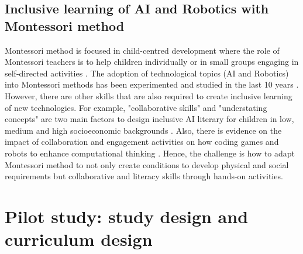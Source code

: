 \documentclass[sigconf,anonymous,review]{acmart}
\begin{document}




\subsection{Inclusive learning of AI and Robotics with Montessori method}
Montessori method is focused in child-centred development where the role of Montessori teachers is to help children individually or in small groups engaging in self-directed activities \cite{Aljabreen2020}.
The adoption of technological topics (AI and Robotics) into Montessori methods has been experimented and studied in the last 10 years \cite{elkin2014}. 
However, there are other skills that are also required to create inclusive learning of new technologies. For example, "collaborative skills" and "understating concepts" are two main factors to design inclusive AI literary for children in low, medium and high socioeconomic backgrounds \cite{druga2019}. 
Also, there is evidence on the impact of collaboration and engagement activities on how coding games and robots to enhance computational thinking \cite{sharma2019}.
Hence, the challenge is how to adapt Montessori method to not only create conditions to develop physical and social requirements but collaborative and literacy skills through hands-on activities. 

\section{Pilot study: study design and curriculum design}
\end{document}
